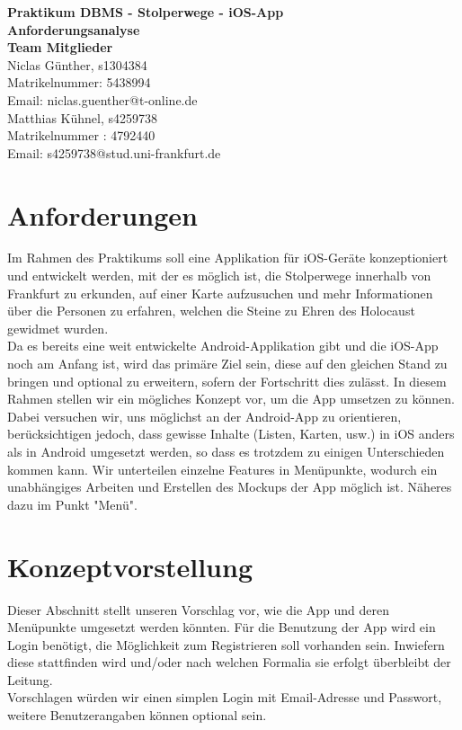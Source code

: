 \documentclass[a4paper, 11pt]{report}
\begin{document}
	\noindent
	\thispagestyle{empty}
	\Large\textbf{Praktikum DBMS - Stolperwege - iOS-App}\\
	\large\textbf{Anforderungsanalyse} \\ \newline
	\large \textbf{Team Mitglieder} \\ \newline
	Niclas G\"unther, s1304384\\
	Matrikelnummer: 5438994\\
	Email: niclas.guenther@t-online.de \\ \newline
	Matthias Kühnel, s4259738\\
	Matrikelnummer : 4792440 \\
	Email: s4259738@stud.uni-frankfurt.de \\
	\newpage
	
	\section*{Anforderungen}
	
	Im Rahmen des Praktikums soll eine Applikation für iOS-Geräte konzeptioniert und entwickelt werden, mit der es möglich ist, die Stolperwege innerhalb von Frankfurt zu erkunden, auf einer Karte aufzusuchen und mehr Informationen über die Personen zu erfahren, welchen die Steine zu Ehren des Holocaust gewidmet wurden.\\
	Da es bereits eine weit entwickelte Android-Applikation gibt und die iOS-App noch am Anfang ist, wird das primäre Ziel sein, diese auf den gleichen Stand zu bringen und optional zu erweitern, sofern der Fortschritt dies zulässt. In diesem Rahmen stellen wir ein mögliches Konzept vor, um die App umsetzen zu können. Dabei versuchen wir, uns möglichst an der Android-App zu orientieren, berücksichtigen jedoch, dass gewisse Inhalte (Listen, Karten, usw.) in iOS anders als in Android umgesetzt werden, so dass es trotzdem zu einigen Unterschieden kommen kann. Wir unterteilen einzelne Features in Menüpunkte, wodurch ein unabhängiges Arbeiten und Erstellen des Mockups der App möglich ist. Näheres dazu im Punkt "Menü".
	
	\section*{Konzeptvorstellung}
	
	Dieser Abschnitt stellt unseren Vorschlag vor, wie die App und deren Menüpunkte umgesetzt werden könnten. Für die Benutzung der App wird ein Login benötigt, die Möglichkeit zum Registrieren soll vorhanden sein. Inwiefern diese stattfinden wird und/oder nach welchen Formalia sie erfolgt überbleibt der Leitung.\\ Vorschlagen würden wir einen simplen Login mit Email-Adresse und Passwort, weitere Benutzerangaben können optional sein.
	
\end{document}
